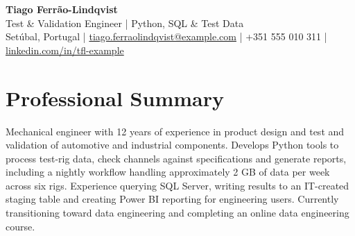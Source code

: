 \documentclass[11pt,a4paper]{article}
\begin{document}
\begin{center}
{\LARGE\bfseries\color{primarycolor} Tiago Ferrão-Lindqvist}\\[0.25em]
{\large Test \& Validation Engineer | Python, SQL \& Test Data}\\[0.25em]
Setúbal, Portugal | \href{mailto:tiago.ferraolindqvist@example.com}{tiago.ferraolindqvist@example.com} | +351 555 010 311 | \href{https://linkedin.com/in/tfl-example}{linkedin.com/in/tfl-example}
\end{center}
\vspace{-0.5em}

\section*{Professional Summary}
Mechanical engineer with 12 years of experience in product design and test and validation of automotive and industrial components. Develops Python tools to process test-rig data, check channels against specifications and generate reports, including a nightly workflow handling approximately 2 GB of data per week across six rigs. Experience querying SQL Server, writing results to an IT-created staging table and creating Power BI reporting for engineering users. Currently transitioning toward data engineering and completing an online data engineering course.
\end{document}
